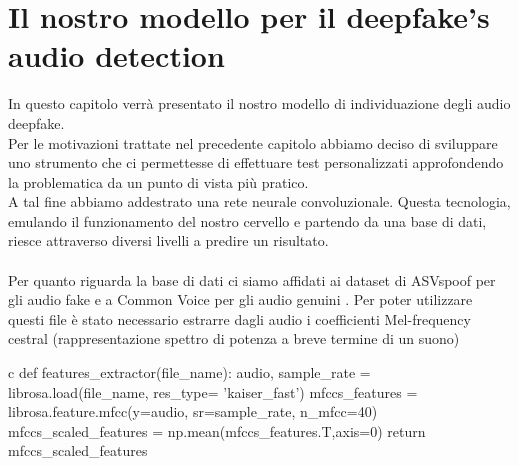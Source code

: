 \documentclass[12pt, a4paper]{article}
\begin{document}
\section{Il nostro modello per il deepfake's audio detection}
In questo capitolo verrà presentato il nostro modello di individuazione degli audio deepfake. \\
Per le motivazioni trattate nel precedente capitolo abbiamo deciso di sviluppare uno strumento che ci permettesse di effettuare test personalizzati approfondendo la problematica da un punto di vista più pratico.\\
A tal fine abbiamo addestrato una rete neurale convoluzionale. Questa tecnologia, emulando il funzionamento del nostro cervello e partendo da una base di dati, riesce attraverso diversi livelli a predire un risultato. \\\\
Per quanto riguarda la base di dati ci siamo affidati ai dataset di ASVspoof per gli audio fake \cite{FakeAudioDataset} e a Common Voice per gli audio genuini \cite{RealAudioDataset}.
Per poter utilizzare questi file è stato necessario estrarre dagli audio i coefficienti Mel-frequency cestral (rappresentazione spettro di potenza a breve termine di un suono)\\



\begin{code}
\label{code:python-code}
\begin{pythoncode}{c}
def features_extractor(file_name):
    audio, sample_rate = librosa.load(file_name, res_type= 'kaiser_fast') 
    mfccs_features = librosa.feature.mfcc(y=audio, sr=sample_rate, n_mfcc=40)
    mfccs_scaled_features = np.mean(mfccs_features.T,axis=0) 
    return mfccs_scaled_features  
\end{pythoncode}
\end{code}
\end{document}
